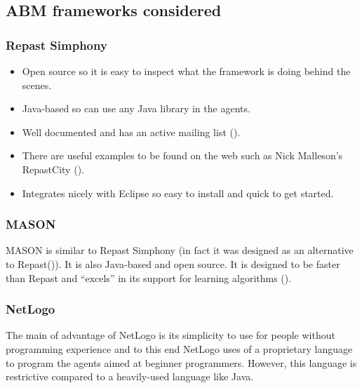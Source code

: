     \subsection{ABM frameworks considered}
    \subsubsection{Repast Simphony}
    \begin{itemize}
      \item Open source so it is easy to inspect what the framework is doing behind the scenes.
      \item Java-based so can use any Java library in the agents.
      \item Well documented and has an active mailing list (\cite{Repast}).
      \item There are useful examples to be found on the web such as Nick Malleson's RepastCity (\cite{Malleson}).
      \item Integrates nicely with Eclipse so easy to install and quick to get started.
    \end{itemize}    
        
    \subsubsection{MASON}
    MASON is similar to Repast Simphony (in fact it was designed as an alternative to Repast(\cite{Allan2009})). It is also Java-based and open source. It is designed to be faster than Repast and ``excels'' in its support for learning algorithms (\cite{Berryman2008}).
      
    \subsubsection{NetLogo}
    The main of advantage of NetLogo is its simplicity to use for people without programming experience and to this end NetLogo uses of a proprietary language to program the agents aimed at beginner programmers. However, this language is restrictive compared to a heavily-used language like Java.
    
